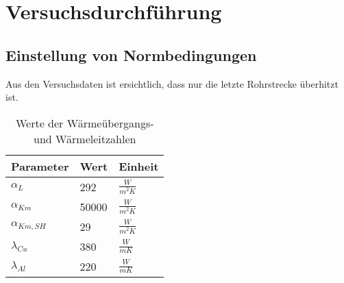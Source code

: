 \chapter{Versuchsdurchführung}
\label{cha:Versuchsdurchführung}


\section{Einstellung von Normbedingungen}






















Aus den Versuchsdaten ist ersichtlich, dass nur die letzte Rohrstrecke überhitzt ist.

\begin{table}[]
\centering
\caption{Werte der Wärmeübergangs- und Wärmeleitzahlen}
\label{tab:Werte der Wärmeübergangs- und Wärmeleitzahlen}
\renewcommand{\arraystretch}{1.2}
\begin{tabular}{|l|l|l|}

\hline
Parameter        & Wert  & Einheit           \\ \hline
$\alpha_{L}$     & 292   & $\frac{W}{m^2 K}$ \\
$\alpha_{Km}$    & 50000 & $\frac{W}{m^2 K}$ \\
$\alpha_{Km,SH}$ & 29    & $\frac{W}{m^2 K}$ \\
$\lambda_{Cu}$   & 380   & $\frac{W}{m K}$   \\
$\lambda_{Al}$   & 220   & $\frac{W}{m K}$   \\ \hline
\end{tabular}
\end{table}